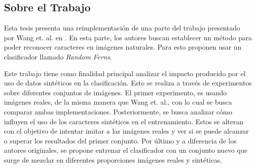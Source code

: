 \subsection{Sobre el Trabajo}

	Esta tesis presenta una reimplementación de una parte del trabajo presentado por Wang et. al. en \cite{wang}. En esta parte, los autores buscan establecer un método para poder reconocer caracteres en imágenes naturales. Para esto proponen usar un clasificador llamado \textit{Random Ferns}.
	
	Este trabajo tiene como finalidad principal analizar el impacto producido por el uso de datos sintéticos en la clasificación. Esto se realiza a través de ex\-pe\-ri\-men\-tos sobre diferentes conjuntos de imágenes. El primer ex\-pe\-ri\-men\-to, es usando imágenes reales, de la misma manera que Wang et. al., con lo cual se busca comparar ambas implementaciones. Posteriormente, se busca analizar cómo influyen el uso de los caracteres sintéticos en el entrenamiento. Estos se alteran con el objetivo de intentar imitar a las imágenes reales y ver si se puede alcanzar o superar los resultados del primer conjunto. Por último y a diferencia de los autores originales, se propone entrenar el clasificador con  un conjunto nuevo que surge de mezclar en diferentes proporciones imágenes reales y sintéticas.